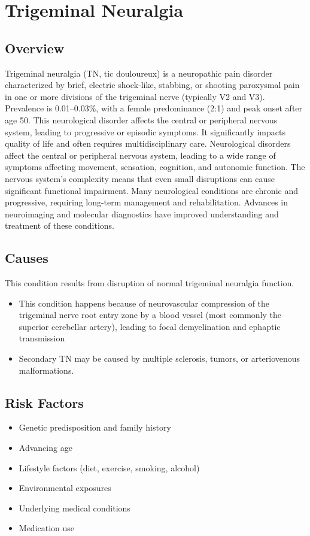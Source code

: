 \chapter{Trigeminal Neuralgia}
\label{sec:Trigeminal Neuralgia}

\section{Overview}
Trigeminal neuralgia (TN, tic douloureux) is a neuropathic pain disorder characterized by brief, electric shock-like, stabbing, or shooting paroxysmal pain in one or more divisions of the trigeminal nerve (typically V2 and V3). Prevalence is 0.01--0.03\%, with a female predominance (2:1) and peak onset after age 50. This neurological disorder affects the central or peripheral nervous system, leading to progressive or episodic symptoms. It significantly impacts quality of life and often requires multidisciplinary care. Neurological disorders affect the central or peripheral nervous system, leading to a wide range of symptoms affecting movement, sensation, cognition, and autonomic function. The nervous system's complexity means that even small disruptions can cause significant functional impairment. Many neurological conditions are chronic and progressive, requiring long-term management and rehabilitation. Advances in neuroimaging and molecular diagnostics have improved understanding and treatment of these conditions.
\section{Causes}
This condition results from disruption of normal trigeminal neuralgia function.

\begin{itemize}[noitemsep]
  \item This condition happens because of neurovascular compression of the trigeminal nerve root entry zone by a blood vessel (most commonly the superior cerebellar artery), leading to focal demyelination and ephaptic transmission
  \item Secondary TN may be caused by multiple sclerosis, tumors, or arteriovenous malformations.
\end{itemize}
\section{Risk Factors}
\begin{itemize}[noitemsep]
  \item Genetic predisposition and family history
  \item Advancing age
  \item Lifestyle factors (diet, exercise, smoking, alcohol)
  \item Environmental exposures
  \item Underlying medical conditions
  \item Medication use
\end{itemize}

